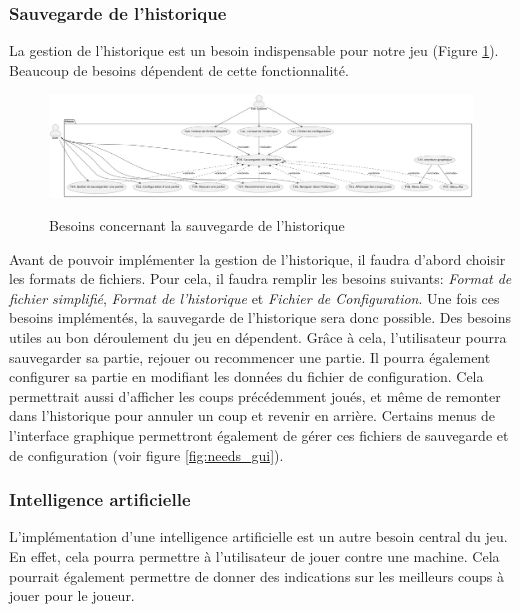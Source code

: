 \documentclass{article}
\begin{document}
\subsubsection{Sauvegarde de l'historique}
La gestion de l'historique est un besoin indispensable pour notre jeu (Figure \ref{fig:needs_files}).
Beaucoup de besoins dépendent de cette fonctionnalité.
\begin{figure}[h]
    \caption{Besoins concernant la sauvegarde de l'historique}
    \centering
    \includegraphics[width=\textwidth,height=\textheight,keepaspectratio]{needs_files}
    \label{fig:needs_files}
\end{figure}

Avant de pouvoir implémenter la gestion de l'historique, il faudra d'abord choisir les formats de fichiers.
Pour cela, il faudra remplir les besoins suivants: \textit{Format de fichier simplifié}, \textit{Format de l'historique} et \textit{Fichier de Configuration}.
Une fois ces besoins implémentés, la sauvegarde de l'historique sera donc possible.
Des besoins utiles au bon déroulement du jeu en dépendent. Grâce à cela, l'utilisateur pourra sauvegarder
sa partie, rejouer ou recommencer une partie. Il pourra également configurer sa partie en modifiant les données du fichier de configuration.
Cela permettrait aussi d'afficher les coups précédemment joués, et même de remonter dans l'historique pour annuler un coup et revenir en arrière.
Certains menus de l'interface graphique permettront également de gérer ces fichiers de sauvegarde et de configuration (voir figure \ref{fig:needs_gui}).

\subsubsection{Intelligence artificielle}
\label{IA}
L'implémentation d'une intelligence artificielle est un autre besoin central du jeu. En effet, cela pourra
permettre à l'utilisateur de jouer contre une machine. Cela pourrait également permettre de donner des
indications sur les meilleurs coups à jouer pour le joueur.
\end{document}
